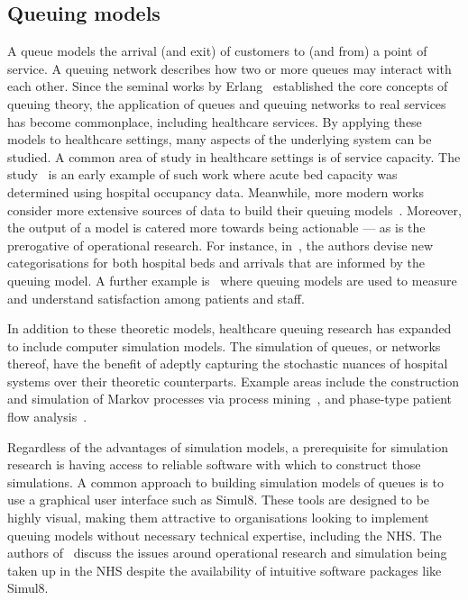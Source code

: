 \subsection{Queuing models}\label{subsec:queuing}

A queue models the arrival (and exit) of customers to (and from) a point of
service. A queuing network describes how two or more queues may interact with
each other. Since the seminal works by Erlang~\cite{Erlang1917,Erlang1920}
established the core concepts of queuing theory, the application of queues and
queuing networks to real services has become commonplace, including healthcare
services. By applying these models to healthcare settings, many aspects of the
underlying system can be studied. A common area of study in healthcare settings
is of service capacity. The study~\cite{McClain1976} is an early example of such
work where acute bed capacity was determined using hospital occupancy data.
Meanwhile, more modern works consider more extensive sources of data to build
their queuing models~\cite{Palvannan2012,Pinto2014,Williams2015}. Moreover, the
output of a model is catered more towards being actionable --- as is the
prerogative of operational research. For instance, in~\cite{Pinto2014}, the
authors devise new categorisations for both hospital beds and arrivals that are
informed by the queuing model. A further example is~\cite{Komashie2015} where
queuing models are used to measure and understand satisfaction among patients
and staff.

In addition to these theoretic models, healthcare queuing research has expanded
to include computer simulation models. The simulation of queues, or networks
thereof, have the benefit of adeptly capturing the stochastic nuances of
hospital systems over their theoretic counterparts. Example areas include the
construction and simulation of Markov processes via process
mining~\cite{Arnolds2018,Prokofyeva2020,Rebuge2012}, and phase-type patient
flow analysis~\cite{Bhattacharjee2014,McClean2011}.

Regardless of the advantages of simulation models, a prerequisite for simulation
research is having access to reliable software with which to construct those
simulations. A common approach to building simulation models of queues is to use
a graphical user interface such as Simul8. These tools are designed to be highly
visual, making them attractive to organisations looking to implement queuing
models without necessary technical expertise, including the NHS. The authors
of~\cite{Brailsford2013} discuss the issues around operational research and
simulation being taken up in the NHS despite the availability of intuitive
software packages like Simul8.

